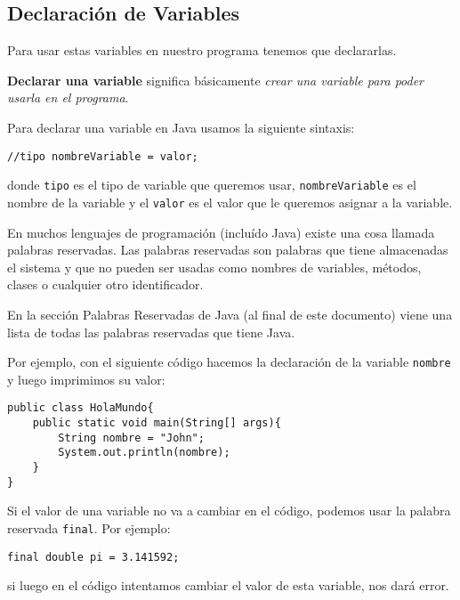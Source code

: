\documentclass[12pt]{article}
\theoremstyle{largebreak}
\begin{document}
    \subsection{Declaración de Variables}

    Para usar estas variables en nuestro programa tenemos que declararlas.

    \begin{mydef}
        \textbf{Declarar una variable} significa básicamente \textit{crear una variable para poder usarla en el programa}.
    \end{mydef}

    \begin{exa}
        Para declarar una variable en Java usamos la siguiente sintaxis:        
        \begin{lstlisting}[caption={Declaración de variables.},label=DescriptiveLabel]
//tipo nombreVariable = valor;
        \end{lstlisting}
        donde \lstinline|tipo| es el tipo de variable que queremos usar, \lstinline|nombreVariable| es el nombre de la variable y el \lstinline|valor| es el valor que le queremos asignar a la variable.
    \end{exa}

    \begin{obs}
        En muchos lenguajes de programación (incluído Java) existe una cosa llamada palabras reservadas. Las palabras reservadas son palabras que tiene almacenadas el sistema y que no pueden ser usadas como nombres de variables, métodos, clases o cualquier otro identificador.
        
        En la sección Palabras Reservadas de Java (al final de este documento) viene una lista de todas las palabras reservadas que tiene Java.
    \end{obs}

    Por ejemplo, con el siguiente código hacemos la declaración de la variable \lstinline|nombre| y luego imprimimos su valor:
    \begin{lstlisting}[caption={Ejemplo declaracion e impresión de variable.},label=DescriptiveLabel]
public class HolaMundo{
    public static void main(String[] args){
        String nombre = "John";
        System.out.println(nombre);
    }
}
    \end{lstlisting}

    \begin{obs}
        Si el valor de una variable no va a cambiar en el código, podemos usar la palabra reservada \lstinline|final|. Por ejemplo:
        \begin{lstlisting}[caption={Variable final.},label=DescriptiveLabel]
final double pi = 3.141592;
        \end{lstlisting}
        si luego en el código intentamos cambiar el valor de esta variable, nos dará error.
    \end{obs}
\end{document}

